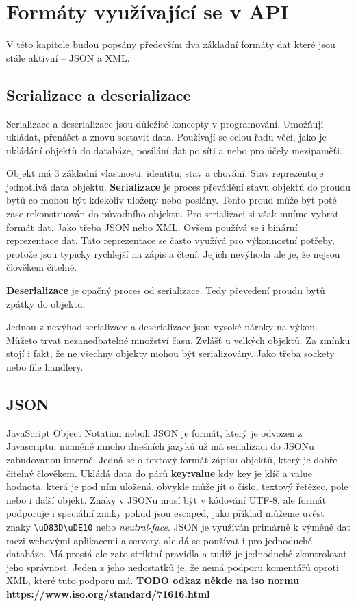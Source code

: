 \chapter{Formáty využívající se v API}
V této kapitole budou popsány především dva základní formáty dat které jsou stále aktivní -- JSON a XML.


\section{Serializace a deserializace} %
Serializace a deserializace jsou důležité koncepty v programování. Umožňují ukládat, přenášet a znovu sestavit data. Používají se celou řadu věcí, jako je ukládání objektů do databáze, posílání dat po síti a nebo pro účely mezipaměťi.

Objekt má 3 základní vlastnosti: identitu, stav a chování. Stav reprezentuje jednotlivá data objektu.
\textbf{Serializace} je proces převádění stavu objektů do proudu bytů co mohou být kdekoliv uloženy nebo poslány. Tento proud může být poté zase rekonstruován do původního objektu. Pro serializaci si však muíme vybrat formát dat. Jako třeba JSON nebo XML. Ovšem používá se i binární reprezentace dat. Tato reprezentace se často využívá pro výkonnostní potřeby, protože jsou typicky rychlejší na zápis a čtení. Jejich nevýhoda ale je, že nejsou člověkem čitelné.

\textbf{Deserializace} je opačný proces od serializace. Tedy převedení proudu bytů zpátky do objektu.

Jednou z nevýhod serializace a deserializace jsou vysoké nároky na výkon. Můžeto trvat nezanedbatelné množství času. Zvlášť u velkých objektů. Za zmínku stojí i fakt, že ne všechny objekty mohou být serializovány. Jako třeba sockety nebo file handlery.


\section{JSON}
JavaScript Object Notation neboli JSON je formát, který je odvozen z Javascriptu, nicméně mnoho dnešních jazyků už má serializaci do JSONu zabudovanou interně. Jedná se o textový formát zápisu objektů, který je dobře čitelný člověkem. Ukládá data do párů \textbf{key:value} kdy key je klíč a value hodnota, která je pod ním uložená, obvykle může jít o číslo, textový řetězec, pole nebo i další objekt. Znaky v JSONu musí být v kódování UTF-8, ale formát podporuje i speciální znaky pokud jsou escaped, jako příklad můžeme uvést znaky \verb |\uD83D\uDE10| nebo \textit{neutral-face}. JSON je využíván primárně k výměně dat mezi webovými aplikacemi a servery, ale dá se používat i pro jednoduché databáze. Má prostá ale zato striktní pravidla a tudíž je jednoduché zkontrolovat jeho správnost. Jeden z jeho nedostatků je, že nemá podporu komentářů oproti XML, které tuto podporu má. \textbf{ TODO odkaz někde na iso normu https://www.iso.org/standard/71616.html} %


